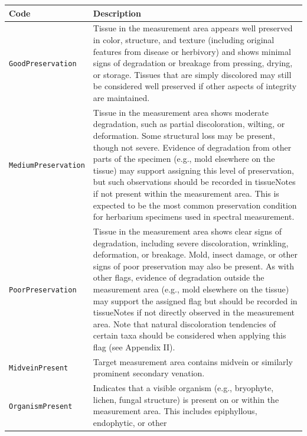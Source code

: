 \documentclass[
  letterpaper,
  DIV=11,
  numbers=noendperiod]{scrreprt}
\begin{document}
\begin{longtable}[]{@{}
  >{\raggedright\arraybackslash}p{}
  >{\raggedright\arraybackslash}p{}@{}}
\toprule\noalign{}
\begin{minipage}[b]{\linewidth}\raggedright
Code
\end{minipage} & \begin{minipage}[b]{\linewidth}\raggedright
Description
\end{minipage} \\
\midrule\noalign{}
\endhead
\bottomrule\noalign{}
\endlastfoot
\texttt{GoodPreservation} & Tissue in the measurement area appears well
preserved in color, structure, and texture (including original features
from disease or herbivory) and shows minimal signs of degradation or
breakage from pressing, drying, or storage. Tissues that are simply
discolored may still be considered well preserved if other aspects of
integrity are maintained. \\
\texttt{MediumPreservation} & Tissue in the measurement area shows
moderate degradation, such as partial discoloration, wilting, or
deformation. Some structural loss may be present, though not severe.
Evidence of degradation from other parts of the specimen (e.g., mold
elsewhere on the tissue) may support assigning this level of
preservation, but such observations should be recorded in tissueNotes if
not present within the measurement area. This is expected to be the most
common preservation condition for herbarium specimens used in spectral
measurement. \\
\texttt{PoorPreservation} & Tissue in the measurement area shows clear
signs of degradation, including severe discoloration, wrinkling,
deformation, or breakage. Mold, insect damage, or other signs of poor
preservation may also be present. As with other flags, evidence of
degradation outside the measurement area (e.g., mold elsewhere on the
tissue) may support the assigned flag but should be recorded in
tissueNotes if not directly observed in the measurement area. Note that
natural discoloration tendencies of certain taxa should be considered
when applying this flag (see Appendix II). \\
\texttt{MidveinPresent} & Target measurement area contains midvein or
similarly prominent secondary venation. \\
\texttt{OrganismPresent} & Indicates that a visible organism (e.g.,
bryophyte, lichen, fungal structure) is present on or within the
measurement area. This includes epiphyllous, endophytic, or other

\end{longtable}
\end{document}
